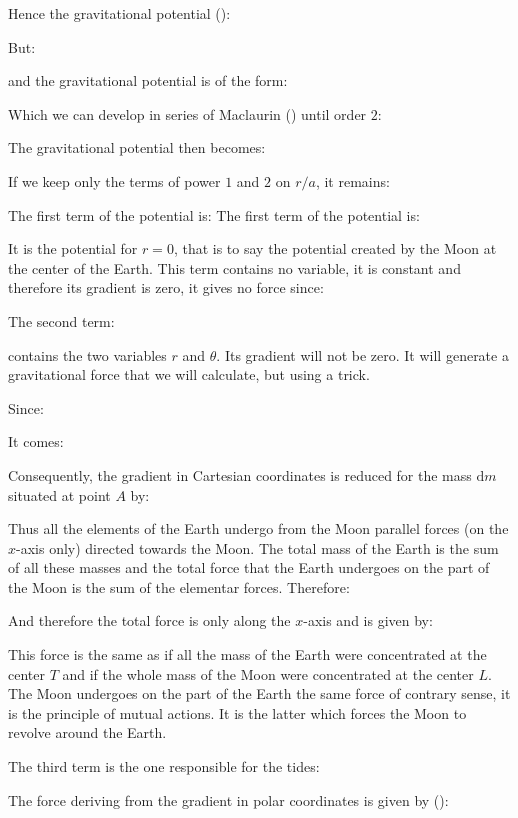 	Hence the gravitational potential ():
	
	But:
	
	and the gravitational potential is of the form:
	
	Which we can develop in series of Maclaurin () until order $2$:
	
	The gravitational potential then becomes:
	
	If we keep only the terms of power $1$ and $2$ on $r / a$, it remains:
	
	The first term of the potential is:
	The first term of the potential is:
	
	It is the potential for $r=0$, that is to say the potential created by the Moon at the center of the Earth.
This term contains no variable, it is constant and therefore its gradient is zero, it gives no force since:
	
	The second term:
	
	contains the two variables $r$ and $\theta$. Its gradient will not be zero. It will generate a gravitational force that we will calculate, but using a trick.

	Since:
	
	It comes:
	
	Consequently, the gradient in Cartesian coordinates is reduced for the mass $\mathrm{d}m$ situated at point $A$ by:
	
	Thus all the elements of the Earth undergo from the Moon parallel forces (on the $x$-axis only) directed towards the Moon. The total mass of the Earth is the sum of all these masses and the total force that the Earth undergoes on the part of the Moon is the sum of the elementar forces. Therefore:
	
	And therefore the total force is only along the $x$-axis and is given by:
	
	This force is the same as if all the mass of the Earth were concentrated at the center $T$ and if the whole mass of the Moon were concentrated at the center $L$. The Moon undergoes on the part of the Earth the same force of contrary sense, it is the principle of mutual actions. It is the latter which forces the Moon to revolve around the Earth.

	The third term is the one responsible for the tides:
	
	The force deriving from the gradient in polar coordinates is given by ():
	
